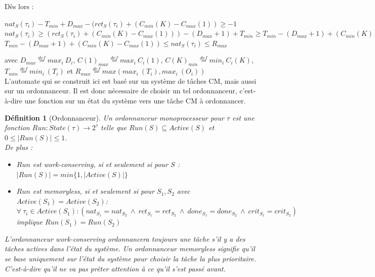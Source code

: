 \documentclass[12pt,a4paper,oneside]{book}
\theoremstyle{break}
\newtheorem{defin}{Définition}[chapter]
\theoremstyle{breakplain}
\begin{document}
Dès lors :

\begin{center}
$nat_S(\tau_i) -T_{min} + D_{max} - (rct_S(\tau_i) + (C_{min}(K)-C_{max}(1)) \geq -1$\\
$nat_S(\tau_i) \geq (rct_S(\tau_i) + (C_{min}(K)-C_{max}(1))) - (D_{max}+1) + T_{min} \geq T_{min}-(D_{max}+1) + (C_{min}(K)-C_{max}(1))$\\
$T_{min}-(D_{max}+1)+ (C_{min}(K)-C_{max}(1)) \leq nat_S(\tau_i) \leq R_{max}$\\
\end{center}

avec $D_{max} \overset{def}{=} max_i\ D_i$, $C(1)_{max} \overset{def}{=} max_i\ C_i(1)$, $C(K)_{min} \overset{def}{=} min_i\ C_i(K)$, $T_{min} \overset{def}{=} min_i\ (T_i)$ et $R_{max} \overset{def}{=} max(max_i\ (T_i), max_i\ (O_i))$\\

L’automate qui se construit ici est basé sur un système de tâches CM, mais aussi sur un ordonnanceur. Il est donc nécessaire de choisir un tel ordonnanceur, c’est-à-dire une fonction sur un état du système vers une tâche CM à ordonnancer.\\

\begin{defin}[Ordonnanceur]
\label{spo:run}
Un \textit{ordonnanceur} monoprocesseur pour $\tau$ est une fonction $Run : State(\tau) \rightarrow 2^\tau$ telle que $Run(S) \subseteq Active(S)$ et $0 \leq |Run(S)| \leq 1$.\\
De plus :
\begin{itemize}
\item $Run$ est \textit{work-conserving}, si et seulement si pour $S$ : $ |Run(S)| = min\{1, |Active(S)|\}$
\item $Run$ est \textit{memoryless}, si et seulement si pour $S_1,S_2$ avec $Active(S_1) = Active(S_2)$:
$\forall\ \tau_i \in Active(S_1) : (nat_{S_1} = nat_{S_2}\ \wedge\ rct_{S_1} = rct_{S_2}\ \wedge\ done_{S_1} = done_{S_2}\ \wedge\ crit_{S_1} = crit_{S_2} )$ implique $Run(S_1) = Run(S_2)$
\end{itemize}

L'ordonnanceur \textit{work-conserving} ordonnancera toujours une tâche s'il y a des tâches actives dans l'état du système. Un ordonnanceur \textit{memoryless} signifie qu'il se base uniquement sur l'état du système pour choisir la tâche la plus prioritaire. C'est-à-dire qu'il ne va pas prêter attention à ce qu'il s'est passé avant.
\end{defin}
\end{document}
